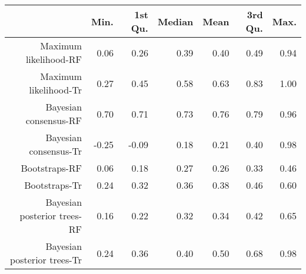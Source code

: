 \begin{table}[ht]
\centering
\begin{tabular}{rrrrrrr}
  \hline
 & Min. & 1st Qu. & Median & Mean & 3rd Qu. & Max. \\ 
  \hline
  Maximum likelihood-RF & 0.06 & 0.26 & 0.39 & 0.40 & 0.49 & 0.94 \\ 
  Maximum likelihood-Tr & 0.27 & 0.45 & 0.58 & 0.63 & 0.83 & 1.00 \\ 
  Bayesian consensus-RF & 0.70 & 0.71 & 0.73 & 0.76 & 0.79 & 0.96 \\ 
  Bayesian consensus-Tr & -0.25 & -0.09 & 0.18 & 0.21 & 0.40 & 0.98 \\ 
  Bootstraps-RF & 0.06 & 0.18 & 0.27 & 0.26 & 0.33 & 0.46 \\ 
  Bootstraps-Tr & 0.24 & 0.32 & 0.36 & 0.38 & 0.46 & 0.60 \\ 
  Bayesian posterior trees-RF & 0.16 & 0.22 & 0.32 & 0.34 & 0.42 & 0.65 \\ 
  Bayesian posterior trees-Tr & 0.24 & 0.36 & 0.40 & 0.50 & 0.68 & 0.98 \\ 
   \hline
\end{tabular}
\end{table}